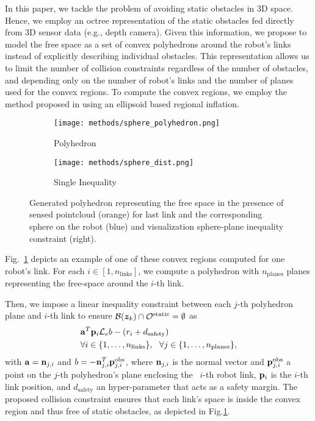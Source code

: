 In this paper, we tackle the problem of avoiding static obstacles in 3D space. Hence, we employ an octree representation of the static obstacles fed directly from 3D sensor data (e.g., depth camera). %
%
Given this information, we propose to model the free space as a set of convex polyhedrons around the robot's links instead of explicitly describing individual obstacles. This representation allows us to limit the number of collision constraints regardless of the number of obstacles, and depending only on the number of robot's links and the number of planes used for the convex regions. To compute the convex regions, we employ the method proposed in \cite{Liu2017} using an ellipsoid based regional inflation.
\begin{figure}[ht]
  \centering
  \begin{subfigure}[b]{0.5\linewidth}
    \centering
    \texttt{[image: methods/sphere\_polyhedron.png]}
    \caption{Polyhedron}
  \end{subfigure}
  \begin{subfigure}[b]{0.45\linewidth}
    \centering
    \texttt{[image: methods/sphere\_dist.png]}
    \caption{Single Inequality}
  \end{subfigure}
  \caption{Generated polyhedron representing the free space in the presence of sensed pointcloud (orange) for last link and the corresponding sphere on the robot (blue) and visualization sphere-plane inequality constraint (right).}%
  \label{fig:plane_sphere}
\end{figure}
%
Fig.~\ref{fig:plane_sphere} depicts an example of one of these convex regions computed for one robot's link.
For each $i\in [1,n_{\textrm{links}}]$, we compute a polyhedron with $n_{\textrm{planes}}$ planes representing the free-space around the $i$-th link. 

Then, we impose a linear inequality constraint between each $j$-th polyhedron plane and $i$-th link to ensure $\mathcal{B}(\bm{z}_k) \cap \mathcal{O}^{\textrm{static}} = \emptyset$ as
%
\begin{equation}
    \begin{split} 
        & \mathbf{a}^T \mathbf{p}_i\mathcal{L}_e b - (r_i + d_{\textrm{safety}}) \\ &\forall i \in \{1,\dots,n_{\textrm{links}}\} , \,\,\,\,
        \forall j \in \{1,\dots,n_{\textrm{planes}}\},
    \end{split}
\end{equation}
with $\mathbf{a} = \mathbf{n}_{j,i}$ and $b = -\mathbf{n}_{j,i}^T\mathbf{p}^{\textrm{obs}}_{j,i}$, where $\mathbf{n}_{j,i}$ is the normal vector and $\mathbf{p}^{\textrm{obs}}_{j,i}$ a point on the $j$-th polyhedron's plane enclosing the ~{$i$-th} robot link, $\mathbf{p}_i$ is the $i$-th link position, and $d_{\textrm{safety}}$ an hyper-parameter that acts as a safety margin. The proposed collision constraint ensures that each link's space is inside the convex region and thus free of static obstacles, as depicted in Fig.\ref{fig:plane_sphere}.
%
